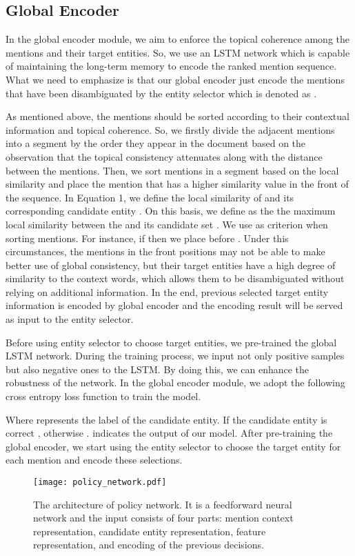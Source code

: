 \documentclass[sigconf]{acmart}
\begin{document}
\subsection{Global Encoder}
In the global encoder module, we aim to enforce the topical coherence among the mentions and their target entities. So, we use an LSTM network which is capable of maintaining the long-term memory to encode the ranked mention sequence. What we need to emphasize is that our global encoder just encode the mentions that have been disambiguated by the entity selector which is denoted as .

As mentioned above, the mentions should be sorted according to their contextual information and topical coherence.  So, we firstly divide the adjacent mentions into a segment by the order they appear in the document based on the observation that the topical consistency attenuates along with the distance between the mentions. Then, we sort mentions in a segment based on the local similarity and place the mention that has a higher similarity value in the front of the sequence. In Equation 1, we define the local similarity of  and its corresponding candidate entity . On this basis, we define  as the the maximum local similarity between the  and its candidate set . We use  as criterion when sorting mentions. For instance, if  then we place  before . Under this circumstances, the mentions in the front positions may not be able to make better use of global consistency, but their target entities have a high degree of similarity to the context words, which allows them to be disambiguated without relying on additional information. In the end, previous selected target entity information is encoded by global encoder and the encoding result will be served as input to the entity selector.

Before using entity selector to choose target entities, we pre-trained the global LSTM network. During the training process, we input not only positive samples but also negative ones to the LSTM. By doing this, we can enhance the robustness of the network. In the global encoder module, we adopt the following cross entropy loss function to train the model.

Where  represents the label of the candidate entity. If the candidate entity is correct , otherwise .  indicates the output of our model. After pre-training the global encoder, we start using the entity selector to choose the target entity for each mention and encode these selections.

\begin{figure}[t]
\centering
\texttt{[image: policy\_network.pdf]}
\caption{The architecture of policy network. It is a feedforward neural network and the input consists of four parts: mention context representation, candidate entity representation, feature representation, and encoding of the previous decisions.}
\end{figure}
\end{document}
